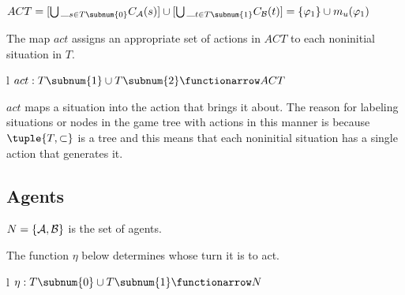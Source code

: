 \begin{definition} $ACT = [\bigcup\__{s \in T\subnum{0}} 
C_{\cal A}(s) ] \cup [\bigcup\__{t \in T\subnum{1}} C_{\cal B}(t) ] = \{\varphi_1\} \cup m_u(\varphi_1)$
\end{definition}

The map $act$ assigns an appropriate set of actions in $ACT$ to each noninitial situation in $T$.

\begin{definition}\label{def:A.6}\begin{tabular}[t]{l} 
{$act: T\subnum{1} \cup T\subnum{2} \functionarrow ACT$}\\
{\hspace{0pc}} 
\end{tabular}
\end{definition}

\noindent $act$ maps a situation into the action that brings it about. The reason for labeling situations or nodes in the game tree with actions in this manner is because $\tuple{T,\subset}$ is a tree and this means that each noninitial situation has a single action that generates it.


\subsection{Agents}\label{sec:A.4.3}

\begin{definition} $N = \{{\cal A}, {\cal B}\}$ is the set of agents.
\end{definition}


The function $\eta$ below determines whose turn it is to act.

\begin{definition}\label{def:A.8}\begin{tabular}[t]{l} {$\eta: T\subnum{0} \cup T\subnum{1} \functionarrow N$}\\
{\hspace{0pc}} 
\end{tabular} \end{definition}

